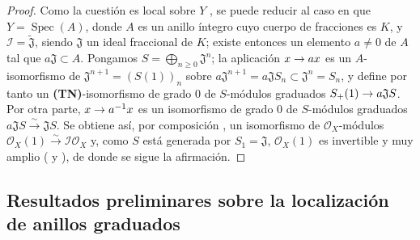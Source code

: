 \documentclass[oneside,10pt]{amsart}
\makeatletter
\renewcommand{\geq}{\geqslant}
\newcommand{\ega@arrow}[2]{\mathchoice{#1}{#2}{#2}{#2}}
\renewcommand{\to}{\ega@arrow{\longrightarrow}{\rightarrow}}
\newcommand{\oldpage}[2][]{\marginnote{\normalfont\footnotesize\textbf{#1}~|~#2}\ignorespaces}
\let\EGAOriginalLabel\label
\renewcommand{\label}[1]{\phantomsection\EGAOriginalLabel{#1}}
\makeatother
\begin{document}
\begin{proof}
Como la cuestión es local sobre $Y$ , se puede reducir al caso en que $Y=\operatorname{Spec}(A)$, donde $A$ es un anillo íntegro cuyo cuerpo de fracciones es $K$, y $\mathcal{I}=\widetilde{\mathfrak{J}}$, siendo $\mathfrak{J}$ un ideal fraccional de $K$;
existe entonces un elemento $a\neq0$ de $A$ tal que $a\mathfrak{J}\subset A$.
Pongamos $S=\bigoplus_{n\geq0}\mathfrak{J}^n$;
la aplicación $x\to ax$ es un $A$-isomorfismo de $\mathfrak{J}^{n+1}=(S(1))_n$ sobre $a\mathfrak{J}^{n+1}=a\mathfrak{J}S_n\subset\mathfrak{J}^n=S_n$,
\oldpage[II]{157}
y define por tanto un \textbf{(TN)}-isomorfismo de grado $0$ de $S$-módulos graduados $S_+(1)\to a\mathfrak{J}S$.
Por otra parte, $x\to a^{-1}x$ es un isomorfismo de grado $0$ de $S$-módulos graduados $a\mathfrak{J}S\xrightarrow{\sim}\mathfrak{J}S$.
Se obtiene así, por composición , un isomorfismo de $\mathcal{O}_X$-módulos $\mathcal{O}_X(1)\xrightarrow{\sim}\mathcal{I}\mathcal{O}_X$ y, como $S$ está generada por $S_1=\mathfrak{J}$, $\mathcal{O}_X(1)$ es invertible  y muy amplio ( y ), de donde se sigue la afirmación.
\end{proof}

\subsection{Resultados preliminares sobre la localización de anillos graduados}
\label{subsection:II.8.2-fr}
\end{document}
